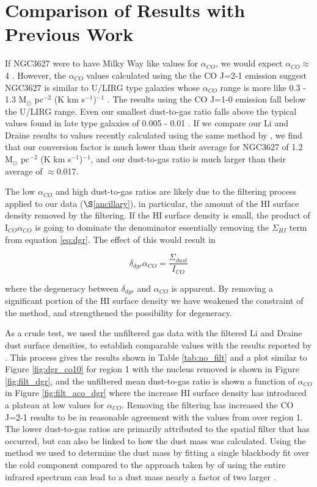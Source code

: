 \section{Comparison of Results with Previous Work}

If NGC3627 were to have Milky Way like values for $\alpha_{CO}$, we would expect $\alpha_{CO}\approx$4 \citep{sandstrom2013}.  However, the $\alpha_{CO}$ values calculated using the the CO J=2-1 emission suggest NGC3627 is similar to U/LIRG type galaxies whose $\alpha_{CO}$ range is more like 0.3 - 1.3 M$_\odot$ pc$^{-2}$ (K km s$^{-1}$)$^{-1}$ \citep{downes1998}.  The results using the CO J=1-0 emission fall below the U/LIRG range.  Even our smallest dust-to-gas ratio falls above the typical values found in late type galaxies of 0.005 - 0.01 \citep{smith2012}.  If we compare our Li and Draine results to values recently calculated using the same method by \cite{sandstrom2013}, we find that our conversion factor is much lower than their average for NGC3627 of 1.2 M$_\odot$ pc$^{-2}$ (K km s$^{-1}$)$^{-1}$, and our dust-to-gas ratio is much larger than their average of $\approx$0.017.  

The low $\alpha_{CO}$ and high dust-to-gas ratios are likely due to the filtering process applied to our data ($\S$\ref{ancillary}), in particular, the amount of the HI surface density removed by the filtering.  If the HI surface density is small, the product of I$_{CO}\alpha_{CO}$ is going to dominate the denominator essentially removing the $\Sigma_{HI}$ term from equation \ref{eq:dgr}.  The effect of this would result in 

\begin{equation}\label{dgr:degen}
  \delta_{dgr}\alpha_{CO} = \frac{\Sigma_{dust}}{I_{CO}}
\end{equation}

\noindent where the degeneracy between $\delta_{dgr}$ and $\alpha_{CO}$ is apparent.  By removing a significant portion of the HI surface density we have weakened the constraint of the method, and strengthened the possibility for degeneracy.

As a crude test, we used the unfiltered gas data with the filtered Li and Draine dust surface densities, to establish comparable values with the results reported by \cite{sandstrom2013}.  This process gives the results shown in Table \ref{tab:no_filt} and a plot similar to Figure \ref{fig:dgr_co10} for region 1 with the nucleus removed is shown in Figure \ref{fig:filt_dgr}, and the unfiltered mean dust-to-gas ratio is shown a function of $\alpha_{CO}$ in Figure \ref{fig:filt_aco_dgr} where the increase HI surface density has introduced a plateau at low values for $\alpha_{CO}$.  Removing the filtering has increased the CO J=2-1 results to be in reasonable agreement with the values from \cite{sandstrom2013} over region 1.  The lower dust-to-gas ratios are primarily attributed to the spatial filter that has occurred, but can also be linked to how the dust mass was calculated.  Using the method we used to determine the dust mass by fitting a single blackbody fit over the cold component compared to the approach taken by \cite{sandstrom2013} of using the entire infrared spectrum can lead to a dust mass nearly a factor of two larger \citep{dale2012}.

